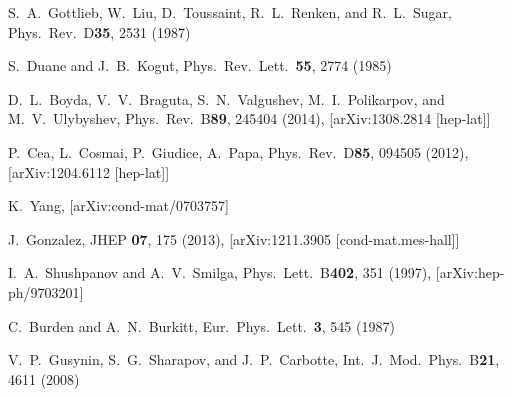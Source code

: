 \documentclass[aps,prd,twocolumn,showpacs,superscriptaddress,groupedaddress]{revtex4}  %
\begin{document}
\begin{thebibliography}{99}
S.~A.~Gottlieb, W.~Liu, D.~Toussaint, R.~L.~Renken, and R.~L.~Sugar, Phys.\ Rev.\ D{\bf 35}, 2531 (1987)

S.~Duane and J.~B.~Kogut, Phys.\ Rev.\ Lett.\ {\bf 55}, 2774 (1985)

D.~L.~Boyda, V.~V.~Braguta, S.~N.~Valgushev, M.~I.~Polikarpov, and M.~V.~Ulybyshev, Phys.\ Rev.\ B{\bf 89}, 245404 (2014), [arXiv:1308.2814 [hep-lat]]

P.~Cea, L.~Cosmai, P.~Giudice, A.~Papa, Phys.\ Rev.\ D{\bf85}, 094505 (2012), [arXiv:1204.6112 [hep-lat]]

K.~Yang, [arXiv:cond-mat/0703757]

J.~Gonzalez, JHEP {\bf 07}, 175 (2013), 	[arXiv:1211.3905 [cond-mat.mes-hall]]

I.~A.~Shushpanov and A.~V.~Smilga, Phys.\ Lett.\ B{\bf 402}, 351 (1997), [arXiv:hep-ph/9703201]

C.~Burden and A.~N.~Burkitt, Eur.\ Phys.\ Lett.\ {\bf 3}, 545 (1987)

V.~P.~Gusynin, S.~G.~Sharapov, and J.~P.~Carbotte, Int.\ J.\ Mod.\ Phys.\ B{\bf 21}, 4611 (2008) 

\end{thebibliography}
\end{document}
